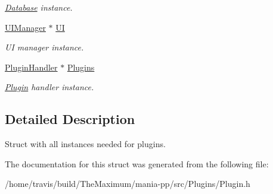 \begin{DoxyCompactItemize}
\begin{DoxyCompactList}\small\item\em \hyperlink{classDatabase}{Database} instance. \end{DoxyCompactList}\item 
\hypertarget{structController_a6ff277dc9e9749bf599b240f93d413b9}{\hyperlink{classUIManager}{U\-I\-Manager} $\ast$ \hyperlink{structController_a6ff277dc9e9749bf599b240f93d413b9}{U\-I}}\label{structController_a6ff277dc9e9749bf599b240f93d413b9}

\begin{DoxyCompactList}\small\item\em U\-I manager instance. \end{DoxyCompactList}\item 
\hypertarget{structController_a03379cc27c876d10e9e8acb73d84deec}{\hyperlink{classPluginHandler}{Plugin\-Handler} $\ast$ \hyperlink{structController_a03379cc27c876d10e9e8acb73d84deec}{Plugins}}\label{structController_a03379cc27c876d10e9e8acb73d84deec}

\begin{DoxyCompactList}\small\item\em \hyperlink{classPlugin}{Plugin} handler instance. \end{DoxyCompactList}\end{DoxyCompactItemize}


\subsection{Detailed Description}
Struct with all instances needed for plugins. 

The documentation for this struct was generated from the following file\-:\begin{DoxyCompactItemize}
\item 
/home/travis/build/\-The\-Maximum/mania-\/pp/src/\-Plugins/Plugin.\-h\end{DoxyCompactItemize}
